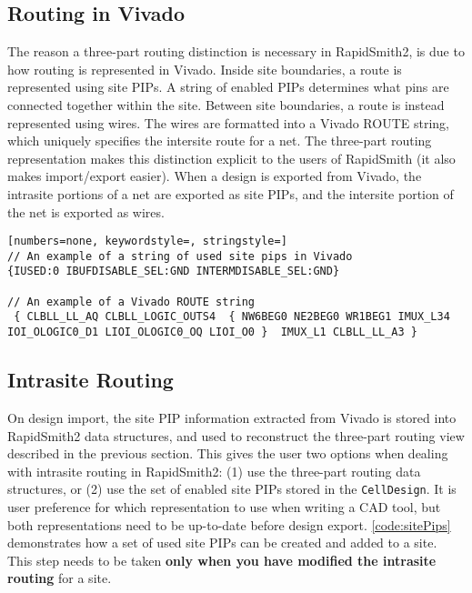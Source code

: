 \subsection{Routing in Vivado}
The reason a three-part routing distinction is necessary in RapidSmith2, is due
to how routing is represented in Vivado. Inside site boundaries, a route is
represented using site PIPs. A string of enabled PIPs determines what pins
are connected together within the site. Between site boundaries, a route is
instead represented using wires. The wires are formatted into a Vivado ROUTE
string, which uniquely specifies the intersite route for a net. The three-part
routing representation makes this distinction explicit to the users of
RapidSmith (it also makes import/export easier). When a design is exported from
Vivado, the intrasite portions of a net are exported as site PIPs, and the
intersite portion of the net is exported as wires.

\begin{lstlisting}[numbers=none, keywordstyle=, stringstyle=]
// An example of a string of used site pips in Vivado
{IUSED:0 IBUFDISABLE_SEL:GND INTERMDISABLE_SEL:GND}

// An example of a Vivado ROUTE string
 { CLBLL_LL_AQ CLBLL_LOGIC_OUTS4  { NW6BEG0 NE2BEG0 WR1BEG1 IMUX_L34
IOI_OLOGIC0_D1 LIOI_OLOGIC0_OQ LIOI_O0 }  IMUX_L1 CLBLL_LL_A3 }
\end{lstlisting}

\subsection{Intrasite Routing}
On design import, the site PIP information extracted from Vivado is stored
into RapidSmith2 data structures, and used to reconstruct the three-part
routing view described in the previous section. This gives the user two options
when dealing with intrasite routing in RapidSmith2: (1) use the three-part
routing data structures, or (2) use the set of enabled site PIPs stored in the
\texttt{CellDesign}. It is user preference for which representation to use
when writing a CAD tool, but both representations need to be up-to-date before
design export. \autoref{code:sitePips} demonstrates how a set of used site PIPs
can be created and added to a site. This step needs to be taken \textbf{only
when you have modified the intrasite routing} for a site.


